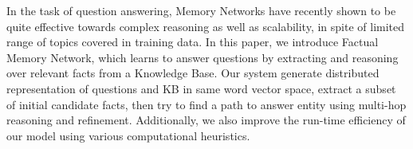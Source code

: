 In the task of question answering, Memory Networks have recently shown to be quite effective towards complex reasoning as well as scalability, in spite of limited range of topics covered in training data. In this paper, we introduce Factual Memory Network, which learns to answer questions by extracting and reasoning over relevant facts from a Knowledge Base. Our system generate distributed representation of questions and KB in same word vector space, extract a subset of initial candidate facts, then try to find a path to answer entity using multi-hop reasoning and refinement. Additionally, we also improve the run-time efficiency of our model using various computational heuristics.
